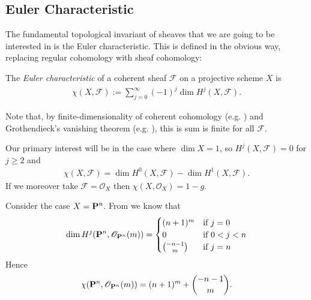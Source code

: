 \documentclass[12pt]{ociamthesis}  %
\begin{document}
\subsection{Euler Characteristic}

The fundamental topological invariant of sheaves that we are going
to be interested in is the Euler characteristic. This is defined
in the obvious way, replacing regular cohomology with sheaf
cohomology:

\begin{definition}
  The \emph{Euler characteristic} of a coherent sheaf $\mathscr F$
  on a projective scheme $X$ is
  \begin{align*}
    \chi (X,\mathscr F) := \sum_{j=0}^\infty (-1)^j \dim H^j (X,\mathscr F).
  \end{align*}
\end{definition}

Note that, by finite-dimensionality of coherent cohomology
(e.g. \cite[\href{https://stacks.math.columbia.edu/tag/02O6}{Tag 02O6}]{stacks-project}) and Grothendieck's vanishing theorem (e.g.
\cite[III Theorem 2.7]{hartshorne1977}), this is sum is finite for
all $\mathscr F$.

\begin{example}
  Our primary interest will be in the case where
  $\dim X = 1$, so $H^j(X,\mathscr F)=0$ for $j\geq 2$ and
  \begin{align*}
    \chi (X,\mathscr F) = \dim H^0(X,\mathscr F)-\dim H^1(X,\mathscr F).
  \end{align*}
  If we moreover take $\mathscr F=\mathscr O_X$ then
  $\chi (X,\mathscr O_X) = 1 - g$. 
\end{example}

\begin{example}
  Consider the case $X=\mathbf{P}^{n}_{}$.
  From \missingcitation we know that
  \begin{align*}
    \dim H^j(\mathbf{P}^{n}_{},\mathscr O_{\mathbf{P}^{n}_{}}(m)) =
    \begin{cases}
      (n+1)^m         & \text{if }j = 0 \\
      0               & \text{if }0<j<n \\
      \binom{-n-1}{m} & \text{if }j=n
    \end{cases}
  \end{align*}
  Hence 
  \begin{align*}
    \chi(\mathbf{P}^{n}_{},\mathscr O_{\mathbf{P}^{n}_{}}(m))
    = (n+1)^m + \binom{-n-1}{m}.
  \end{align*}
\end{example}
\end{document}
